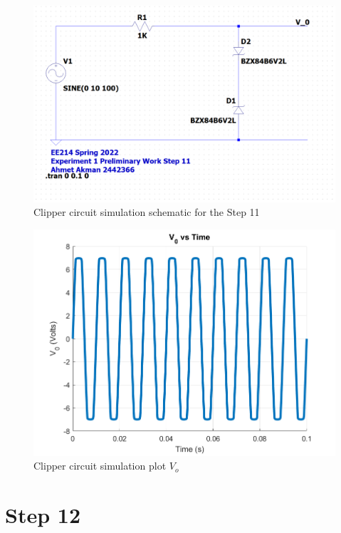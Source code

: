 \documentclass[letterpaper,12pt]{article}
\begin{document}
\begin{figure}[H]
\centering
\includegraphics[width=1\textwidth]{11SCH.png}
\caption{Clipper circuit simulation schematic for the Step 11}
\end{figure} 



\begin{figure}[H]
    \centering
   \includegraphics[width=1\textwidth]{11.png}
   \caption{Clipper circuit simulation plot \(V_o\) }
\end{figure} 

\iffalse
\section{Step 12}
\end{document}
